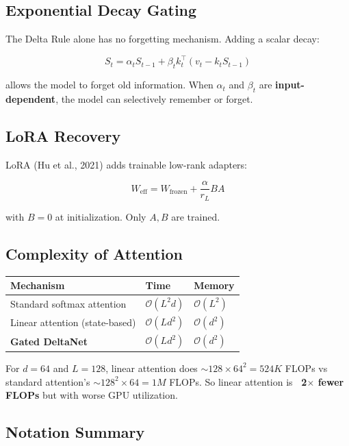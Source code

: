 \subsection{Exponential Decay Gating}

The Delta Rule alone has no forgetting mechanism. Adding a scalar decay:

\[
S_t = \alpha_t S_{t-1} + \beta_t k_t^\top (v_t - k_t S_{t-1})
\tag{3.4}
\]

allows the model to forget old information. When $\alpha_t$ and $\beta_t$ 
are \textbf{input-dependent}, the model can selectively remember or forget.

\subsection{LoRA Recovery}

LoRA (Hu et al., 2021) adds trainable low-rank adapters:

\[
W_\text{eff} = W_\text{frozen} + \frac{\alpha}{r_L} BA
\tag{3.5}
\]

with $B = 0$ at initialization. Only $A, B$ are trained.

\subsection{Complexity of Attention}

\begin{table}[H]
\centering
\small
\begin{tabular}{lll}
\toprule
\textbf{Mechanism} & \textbf{Time} & \textbf{Memory} \\
\midrule
Standard softmax attention & $\mathcal{O}(L^2 d)$ & $\mathcal{O}(L^2)$ \\
Linear attention (state-based) & $\mathcal{O}(L d^2)$ & $\mathcal{O}(d^2)$ \\
\textbf{Gated DeltaNet} & $\mathcal{O}(L d^2)$ & $\mathcal{O}(d^2)$ \\
\bottomrule
\end{tabular}
\end{table}

For $d = 64$ and $L = 128$, linear attention does $\sim 128 \times 64^2 = 
524K$ FLOPs vs standard attention's $\sim 128^2 \times 64 = 1M$ FLOPs. 
So linear attention is \textbf{~2$\times$ fewer FLOPs} but with worse GPU utilization.

\subsection{Notation Summary}

